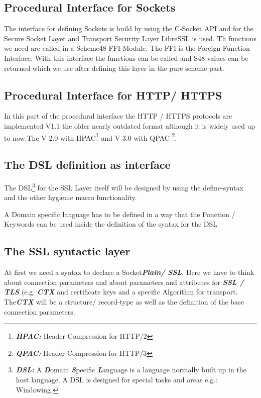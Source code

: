 \documentclass[10pt,a4paper,english]{article}
\newcommand{\abbrhighcol}[1]{\textbf{\textit{#1}}}
\begin{document}
\begin{multicols}{2}
\subsection{Procedural Interface for Sockets}
\begin{flushleft}
The interface for defining Sockets is build by using the C-Socket API and for the Secure Socket Layer and Transport Security Layer LibreSSL is used.
Th functions we need are called in a Scheme48 FFI Module. The FFI is the Foreign Function Interface. With this interface the functions can be called and S48 values can be returned which we use after defining this layer in the pure scheme part.  
\end{flushleft}

\subsection{Procedural Interface for HTTP/ HTTPS}
\begin{flushleft}
In this part of the procedural interface the HTTP / HTTPS protocols are implemented V1.1 the older nearly outdated format although it is widely used up to now.The V 2.0 with HPAC\footnote{\abbrhighcol{HPAC: } Header Compression for HTTP/2} and V 3.0 with QPAC \footnote{\abbrhighcol{QPAC: } Header Compression for HTTP/3}.  
\end{flushleft}


\subsection{The DSL definition as interface}
\begin{flushleft}
The DSL\footnote{\abbrhighcol{DSL: } A \abbrhighcol {D}omain \abbrhighcol{S}pecific \abbrhighcol{L}anguage is a language normally built up in the host language. A DSL is designed for special tasks and areas e.g.: Windowing.} for the SSL Layer itself will be designed by using the define-syntax and the other hygienic macro functionality.
\end{flushleft}
A Domain specific language has to be defined in a way that the Function / Keywords can be used inside the definition of the syntax for the DSL

\subsection{The SSL syntactic layer}
\begin{flushleft}
 At first we need a syntax to declare a Socket\abbrhighcol  {Plain/ SSL}. Here we have to think about connection parameters and about parameters and attributes for \abbrhighcol  {SSL / TLS} (e.g. \abbrhighcol  {CTX} and certificate keys and a specific Algorithm for transport. 
The\abbrhighcol  {CTX} will be a structure/ record-type as well as the definition of the base connection parameters. 
\end{flushleft}


\end{multicols}
\end{document}
